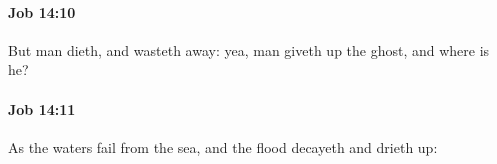 		\paragraph{Job 14:10} %
			\label{JOB-14-10}

			But man dieth, and wasteth away: yea, man giveth up the ghost, and where is he?


		\paragraph{Job 14:11} %
			\label{JOB-14-11}

			As the waters fail from the sea, and the flood decayeth and drieth up:



